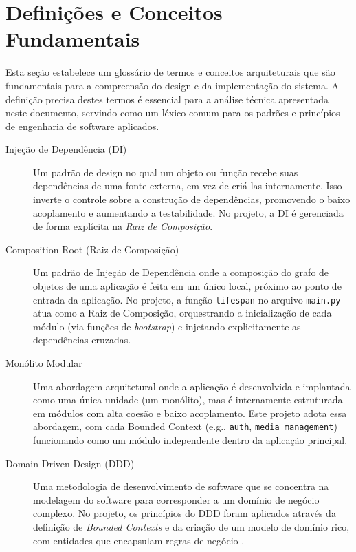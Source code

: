 \section{Definições e Conceitos Fundamentais}
\label{sec:definicoes}

Esta seção estabelece um glossário de termos e conceitos arquiteturais que são fundamentais para a compreensão do design e da implementação do sistema. A definição precisa destes termos é essencial para a análise técnica apresentada neste documento, servindo como um léxico comum para os padrões e princípios de engenharia de software aplicados.

\begin{description}
    \item[Injeção de Dependência (DI)] Um padrão de design no qual um objeto ou função recebe suas dependências de uma fonte externa, em vez de criá-las internamente. Isso inverte o controle sobre a construção de dependências, promovendo o baixo acoplamento e aumentando a testabilidade. No projeto, a DI é gerenciada de forma explícita na \textit{Raiz de Composição}.

    \item[Composition Root (Raiz de Composição)] Um padrão de Injeção de Dependência onde a composição do grafo de objetos de uma aplicação é feita em um único local, próximo ao ponto de entrada da aplicação. No projeto, a função \texttt{lifespan} no arquivo \texttt{main.py} atua como a Raiz de Composição, orquestrando a inicialização de cada módulo (via funções de \textit{bootstrap}) e injetando explicitamente as dependências cruzadas.

    \item[Monólito Modular] Uma abordagem arquitetural onde a aplicação é desenvolvida e implantada como uma única unidade (um monólito), mas é internamente estruturada em módulos com alta coesão e baixo acoplamento. Este projeto adota essa abordagem, com cada Bounded Context (e.g., \texttt{auth}, \texttt{media\_management}) funcionando como um módulo independente dentro da aplicação principal.

    \item[Domain-Driven Design (DDD)] Uma metodologia de desenvolvimento de software que se concentra na modelagem do software para corresponder a um domínio de negócio complexo. No projeto, os princípios do DDD foram aplicados através da definição de \textit{Bounded Contexts} e da criação de um modelo de domínio rico, com entidades que encapsulam regras de negócio \cite{evans2004domain}.


\end{description}
